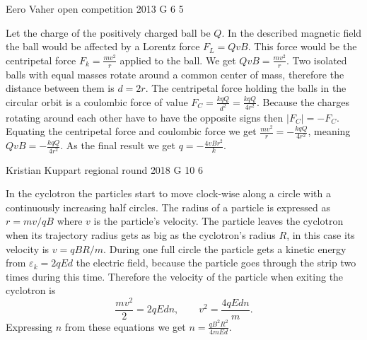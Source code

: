 \documentclass[11pt]{article}
\begin{document}
{Eero Vaher} %
{open competition} %
{2013} %
{G 6} %
{5} %
{

\ifEngSolution
Let the charge of the positively charged ball be $Q$. In the described magnetic field the ball would be affected by a Lorentz force $F_L=QvB$. This force would be the centripetal force $F_k=\frac{mv^2}{r}$ applied to the ball. We get $QvB=\frac{mv^2}{r}$. Two isolated balls with equal masses rotate around a common center of mass, therefore the distance between them is $d=2r$. The centripetal force holding the balls in the circular orbit is a coulombic force of value $F_C=\frac{kqQ}{d^2}=\frac{kqQ}{4r^2}$. Because the charges rotating around each other have to have the opposite signs then $|F_C|=-F_C$. Equating the centripetal force and coulombic force we get $\frac{mv^2}{r}=-\frac{kqQ}{4r^2}$, meaning $QvB=-\frac{kqQ}{4r^2}$. As the final result we get $q=-\frac{4vBr^2}{k}$.
\fi
}

{Kristian Kuppart} %
{regional round} %
{2018} %
{G 10} %
{6} %
{

\ifEngSolution
In the cyclotron the particles start to move clock-wise along a circle with a continuously increasing half circles. The radius of a particle is expressed as $r=mv/qB$ where $v$ is the particle’s velocity. The particle leaves the cyclotron when its trajectory radius gets as big as the cyclotron’s radius $R$, in this case its velocity is $v=qBR/m$. During one full circle the particle gets a kinetic energy from $\varepsilon_k=2qEd$ the electric field, because the particle goes through the strip two times during this time. Therefore the velocity of the particle when exiting the cyclotron is
\[\frac{mv^2}{2}=2qEdn, \qquad v^2=\frac{4qEdn}{m}.\]
Expressing $n$ from these equations we get $\displaystyle n=\frac{qB^2R^2}{4mEd}$.
\fi
}
\end{document}
